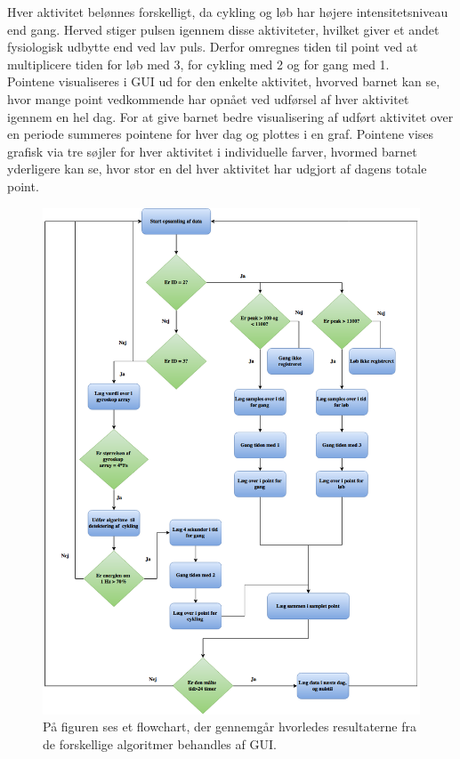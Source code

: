 Hver aktivitet belønnes forskelligt, da cykling og løb har højere intensitetsniveau end gang. Herved stiger pulsen igennem disse aktiviteter, hvilket giver et andet fysiologisk udbytte end ved lav puls. Derfor omregnes tiden til point ved at multiplicere tiden for løb med 3, for cykling med 2 og for gang med 1.\\ 
Pointene visualiseres i GUI ud for den enkelte aktivitet, hvorved barnet kan se, hvor mange point vedkommende har opnået ved udførsel af hver aktivitet igennem en hel dag. For at give barnet bedre visualisering af udført aktivitet over en periode summeres pointene for hver dag og plottes i en graf. Pointene vises grafisk via tre søjler for hver aktivitet i individuelle farver, hvormed barnet yderligere kan se, hvor stor en del hver aktivitet har udgjort af dagens totale point.  
\begin{figure}[H]
	\centering
	\includegraphics[scale=0.4]{figures/cDesign/pseudo_GUI.png}
	\caption{På figuren ses et flowchart, der gennemgår hvorledes resultaterne fra de forskellige algoritmer behandles af GUI.}
	\label{fig:GUI}
\end{figure}


